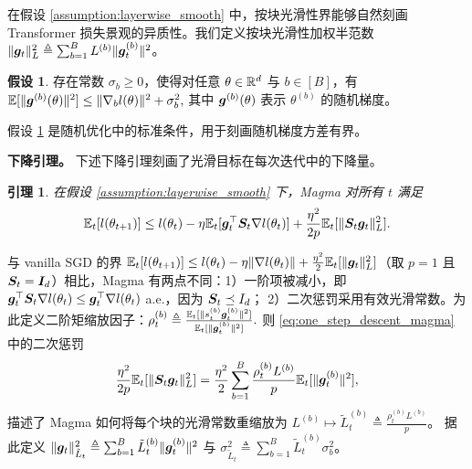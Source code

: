 \documentclass[11pt, a4paper, twocolumn, copyright, goog]{google}
\theoremstyle{plain}
\newtheorem{lemma}[theorem]{引理}
\theoremstyle{definition}
\newtheorem{assumption}[theorem]{假设}
\theoremstyle{remark}
\begin{document}
在假设 \ref{assumption:layerwise_smooth} 中，按块光滑性界能够自然刻画 Transformer 损失景观的异质性。我们定义按块光滑性加权半范数 $\| {\bm{g}}_t \|_L^2 \triangleq \sum_{b=1}^{B} L^{(b)} \| {\bm{g}}_t^{(b)} \|^2$。


\begin{assumption} \label{assumption:layerwise_second_moment}
    存在常数 $\sigma_b \geq 0$，使得对任意 $\theta \in \mathbb{R}^d$ 与 $b \in [B]$，有 $\mathbb{E} [ \| {\bm{g}}^{(b)}(\theta) \|^2 ] \leq \| \nabla_b l(\theta) \|^2 + \sigma_b^2,$ 其中 ${\bm{g}}^{(b)}(\theta)$ 表示 $\theta^{(b)}$ 的随机梯度。
\end{assumption}

假设 \ref{assumption:layerwise_second_moment} 是随机优化中的标准条件，用于刻画随机梯度方差有界。






\textbf{下降引理。} 
下述下降引理刻画了光滑目标在每次迭代中的下降量。

\begin{lemma} \label{prop:magma_descent}
    在假设 \ref{assumption:layerwise_smooth} 下，Magma 对所有 $t$ 满足 
    \begin{equation} \label{eq:one_step_descent_magma}
        \mathbb{E}_t[l(\theta_{t+1})] 
            \leq l(\theta_t) - \eta \mathbb{E}_t [{\bm{g}}_t^\top {\bm{S}}_t \nabla l(\theta_t)] + \frac{\eta^2}{2p} \mathbb{E}_t [\| {\bm{S}}_t {\bm{g}}_t \|_L^2 ].
    \end{equation}
\end{lemma}

与 vanilla SGD 的界
$\mathbb{E}_t[l(\theta_{t+1})]  \leq l(\theta_t) - \eta \| \nabla l(\theta_t) \| + \frac{\eta^2}{2} \mathbb{E}_t [\| {\bm{g}}_t \|_L^2 ]$（取 $p=1$ 且 ${\bm{S}}_t = {\bm{I}}_{d}$）相比，Magma 有两点不同：1）一阶项被减小，即 ${\bm{g}}_t^\top {\bm{S}}_t \nabla l(\theta_t) \le  {\bm{g}}_t^\top \nabla l(\theta_t)$ a.e.，因为 ${\bm{S}}_t\preceq I_d$；
2）二次惩罚采用有效光滑常数。为此定义二阶矩缩放因子：$\rho_t^{(b)} \triangleq \frac{\mathbb{E}_t [\| s_t^{(b)} {\bm{g}}_t^{(b)} \|^2] }{ \mathbb{E}_t [ \| {\bm{g}}_t^{(b)} \|^2]}.$
则 \eqref{eq:one_step_descent_magma} 中的二次惩罚  
\begin{equation} \label{eq:eff_smoothness}
    \frac{\eta^2}{2p} \mathbb{E}_t [\| {\bm{S}}_t  {\bm{g}}_t \|_L^2 ] 
        = \frac{\eta^2}{2} \sum_{b=1}^{B} \frac{\rho_t^{(b)} L^{(b)}}{p} \mathbb{E}_t [\| {\bm{g}}_t^{(b)} \|^2 ], 
\end{equation}
描述了 Magma 如何将每个块的光滑常数重缩放为 $L^{(b)} \mapsto \tilde{L}_{t}^{(b)} \triangleq  \frac{\rho_t^{(b)} L^{(b)}}{p}$。 
据此定义 $\| {\bm{g}}_t \|_{\tilde{L}_t}^2 \triangleq \sum_{b=1}^{B} \tilde{L}_t^{(b)} \| {\bm{g}}_t^{(b)} \|^2$ 与 $\sigma^2_{\tilde{L}_t} \triangleq \sum_{b=1}^{B} \tilde{L}_{t}^{(b)} \sigma_b^2 $。
\end{document}
